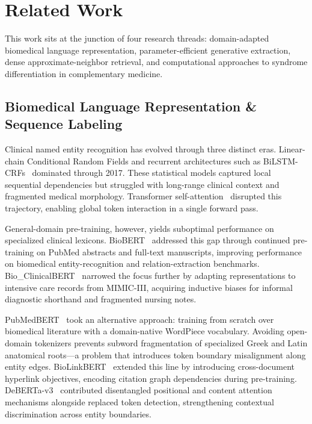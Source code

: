 \section{Related Work}
\label{sec:related_work}

This work sits at the junction of four research threads: domain-adapted biomedical language representation, parameter-efficient generative extraction, dense approximate-neighbor retrieval, and computational approaches to syndrome differentiation in complementary medicine.

\subsection{Biomedical Language Representation \& Sequence Labeling}

Clinical named entity recognition has evolved through three distinct eras. Linear-chain Conditional Random Fields and recurrent architectures such as BiLSTM-CRFs~\cite{lample2016neural} dominated through 2017. These statistical models captured local sequential dependencies but struggled with long-range clinical context and fragmented medical morphology. Transformer self-attention~\cite{devlin2019bert} disrupted this trajectory, enabling global token interaction in a single forward pass.

General-domain pre-training, however, yields suboptimal performance on specialized clinical lexicons. BioBERT~\cite{lee2020biobert} addressed this gap through continued pre-training on PubMed abstracts and full-text manuscripts, improving performance on biomedical entity-recognition and relation-extraction benchmarks. Bio\_ClinicalBERT~\cite{alsentzer2019publicly} narrowed the focus further by adapting representations to intensive care records from MIMIC-III, acquiring inductive biases for informal diagnostic shorthand and fragmented nursing notes.

PubMedBERT~\cite{gu2021domain} took an alternative approach: training from scratch over biomedical literature with a domain-native WordPiece vocabulary. Avoiding open-domain tokenizers prevents subword fragmentation of specialized Greek and Latin anatomical roots---a problem that introduces token boundary misalignment along entity edges. BioLinkBERT~\cite{yasunaga2022linkbert} extended this line by introducing cross-document hyperlink objectives, encoding citation graph dependencies during pre-training. DeBERTa-v3~\cite{he2021deberta} contributed disentangled positional and content attention mechanisms alongside replaced token detection, strengthening contextual discrimination across entity boundaries.

